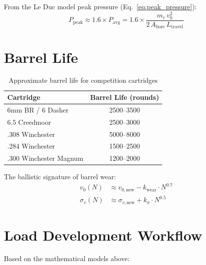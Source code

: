 \documentclass[11pt,twoside,openright]{report}
\begin{document}
From the Le Duc model peak pressure (Eq.~\ref{eq:peak_pressure}):
\begin{equation}
  P_{\mathrm{peak}} \approx 1.6 \times P_{\mathrm{avg}}
  = 1.6 \times \frac{m_e\,v_0^2}{2\,A_{\mathrm{bore}}\,L_{\mathrm{travel}}}
  \label{eq:pressure_estimate}
\end{equation}

\section{Barrel Life}

\begin{table}[H]
\centering
\caption{Approximate barrel life for competition cartridges}
\label{tab:barrel_life}
\begin{tabular}{@{}lc@{}}
\toprule
\textbf{Cartridge} & \textbf{Barrel Life (rounds)} \\
\midrule
6mm BR / 6 Dasher & 2500--3500 \\
6.5 Creedmoor & 2500--3000 \\
.308 Winchester & 5000--8000 \\
.284 Winchester & 1500--2500 \\
.300 Winchester Magnum & 1200--2000 \\
\bottomrule
\end{tabular}
\end{table}

The ballistic signature of barrel wear:
\begin{align}
  v_0(N) &\approx v_{0,\text{new}} - k_{\mathrm{wear}} \cdot N^{0.7} \label{eq:barrel_wear_v}\\
  \sigma_v(N) &\approx \sigma_{v,\text{new}} + k_{\sigma} \cdot N^{0.5} \label{eq:barrel_wear_sd}
\end{align}

\section{Load Development Workflow}

Based on the mathematical models above:
\end{document}
